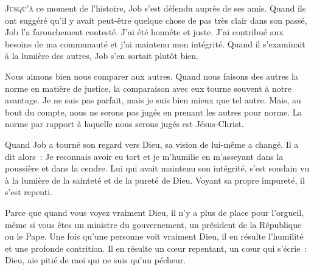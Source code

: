 



\lettrine{J}{usqu'à} ce moment de l'histoire,
 Job s'est défendu auprès de ses amis.
 Quand ils ont suggéré qu'il y avait peut-être quelque chose
 de pas très clair dans son passé, Job l'a farouchement contesté.
 \Og J'ai été honnête et juste. J'ai contribué aux besoins de ma communauté
 et j'ai maintenu mon intégrité. \Fg{}
 Quand il s'examinait à la lumière des autres, Job s'en sortait plutôt bien.

Nous aimons bien nous comparer aux autres.
 Quand nous faisons des autres la norme en matière de justice,
 la comparaison avec eux tourne souvent à notre avantage.
 \Og Je ne suis pas parfait, mais je suis bien mieux que tel autre. \Fg{}
 Mais, au bout du compte, nous ne serons pas jugés en prenant
 les autres pour norme.
 La norme par rapport à laquelle nous serons jugés est Jésus-Christ.

Quand Job a tourné son regard vers Dieu, sa vision de lui-même a changé.
 Il a dit alors~: \Og Je reconnais avoir eu tort et je m'humilie en m'asseyant
 dans la poussière et dans la cendre. \Fg{}
 Lui qui avait maintenu son intégrité, s'est soudain vu à la lumière
 de la sainteté et de la pureté de Dieu.
 Voyant sa propre impureté, il s'est repenti.


Parce que quand vous voyez vraiment Dieu,
 il n'y a plus de place pour l'orgueil,
 même si vous êtes un ministre du gouvernement,
 un président de la République ou le Pape.
 Une fois qu'une personne voit vraiment Dieu,
 il en résulte l'humilité et une profonde contrition.
 Il en résulte un c\oe{}ur repentant,
 un c\oe{}ur qui s'écrie~:
 \Og Dieu, aie pitié de moi qui ne suis qu'un pécheur. \Fg{}

\dvrule




